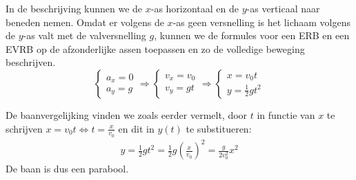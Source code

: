 \documentclass{ximera}
\begin{document}
\begin{image}[0.6\textwidth]
\end{image}

In de beschrijving kunnen we de $x$-as horizontaal en de $y$-as verticaal naar beneden nemen. Omdat er volgens de $x$-as geen versnelling is het lichaam volgens de $y$-as valt met de valversnelling $g$, kunnen we de formules voor een ERB en een EVRB op de afzonderlijke assen toepassen en zo de volledige beweging beschrijven.
\begin{equation*}
	\left\{
	\begin{array}{l}
	a_x=0\\
	a_y=g
	\end{array}
	\right.
	\Rightarrow
	\left\{
	\begin{array}{l}
	v_x=v_0\\
	v_y=gt
	\end{array}
	\right.
	\Rightarrow
	\left\{
	\begin{array}{l}
	x=v_0t\\
	y=\frac{1}{2}gt^2
	\end{array}
	\right.
\end{equation*}


De baanvergelijking vinden we zoals eerder vermelt, door $t$ in functie van $x$ te schrijven $x=v_0t\Leftrightarrow t=\frac{x}{v_0}$ en dit in $y(t)$ te substitueren:
\begin{eqnarray*}
	y=\frac{1}{2}gt^2=\frac{1}{2}g\left(\frac{x}{v_0}\right)^2=\frac{g}{2v_0^2}x^2
\end{eqnarray*}
De baan is dus een parabool.
\end{document}
